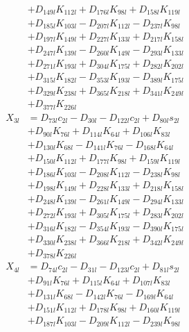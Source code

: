 \begin{multicols}{2}
\begin{align}
&+ D_{149l}K_{112l} + D_{176l}K_{98l} + D_{158l}K_{119l}  \nonumber \\
&+ D_{185l}K_{103l} - D_{207l}K_{112l} - D_{237l}K_{98l}  \nonumber \\
&+ D_{197l}K_{149l} + D_{227l}K_{133l} + D_{217l}K_{158l}  \nonumber \\
&+ D_{247l}K_{139l} - D_{260l}K_{149l} - D_{293l}K_{133l}  \nonumber \\
&+ D_{271l}K_{193l} + D_{304l}K_{175l} + D_{282l}K_{202l}  \nonumber \\
&+ D_{315l}K_{182l} - D_{353l}K_{193l} - D_{389l}K_{175l}  \nonumber \\
&+ D_{329l}K_{238l} + D_{365l}K_{218l} + D_{341l}K_{249l}  \nonumber \\
&+ D_{377l}K_{226l} \nonumber \\
X_{3l} &= D_{73l}c_{2l} - D_{30l} - D_{122l}c_{2l} + D_{80l}s_{2l}  \nonumber \\
&+ D_{90l}K_{76l} + D_{114l}K_{64l} + D_{106l}K_{83l}  \nonumber \\
&+ D_{130l}K_{68l} - D_{141l}K_{76l} - D_{168l}K_{64l}  \nonumber \\
&+ D_{150l}K_{112l} + D_{177l}K_{98l} + D_{159l}K_{119l}  \nonumber \\
&+ D_{186l}K_{103l} - D_{208l}K_{112l} - D_{238l}K_{98l}  \nonumber \\
&+ D_{198l}K_{149l} + D_{228l}K_{133l} + D_{218l}K_{158l}  \nonumber \\
&+ D_{248l}K_{139l} - D_{261l}K_{149l} - D_{294l}K_{133l}  \nonumber \\
&+ D_{272l}K_{193l} + D_{305l}K_{175l} + D_{283l}K_{202l}  \nonumber \\
&+ D_{316l}K_{182l} - D_{354l}K_{193l} - D_{390l}K_{175l}  \nonumber \\
&+ D_{330l}K_{238l} + D_{366l}K_{218l} + D_{342l}K_{249l}  \nonumber \\
&+ D_{378l}K_{226l} \nonumber \\
X_{4l} &= D_{74l}c_{2l} - D_{31l} - D_{123l}c_{2l} + D_{81l}s_{2l}  \nonumber \\
&+ D_{91l}K_{76l} + D_{115l}K_{64l} + D_{107l}K_{83l}  \nonumber \\
&+ D_{131l}K_{68l} - D_{142l}K_{76l} - D_{169l}K_{64l}  \nonumber \\
&+ D_{151l}K_{112l} + D_{178l}K_{98l} + D_{160l}K_{119l}  \nonumber \\
&+ D_{187l}K_{103l} - D_{209l}K_{112l} - D_{239l}K_{98l}  \nonumber \\

\end{align}
\end{multicols}
